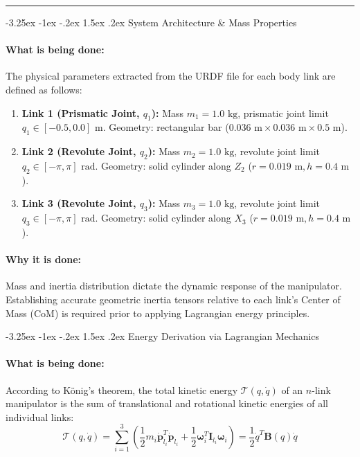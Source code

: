 \documentclass[11pt, a4paper]{article}
\makeatletter
\renewcommand{\subsection}{\@startsection{subsection}{2}{\z@}%
    {-3.25ex \@plus -1ex \@minus -.2ex}%
    {1.5ex \@plus .2ex}%
    {\normalfont\large\bfseries\color{brandaccent}}}
\makeatother
\begin{document}
\hrule
\vspace{1.5em}

\subsection{System Architecture \& Mass Properties}
\paragraph{What is being done:}
The physical parameters extracted from the URDF file for each body link are defined as follows:
\begin{enumerate}[leftmargin=1.5em]
    \item \textbf{Link 1 (Prismatic Joint, $q_1$):} Mass $m_1 = 1.0\text{ kg}$, prismatic joint limit $q_1 \in [-0.5, 0.0]\text{ m}$. Geometry: rectangular bar ($0.036\text{ m} \times 0.036\text{ m} \times 0.5\text{ m}$).
    \item \textbf{Link 2 (Revolute Joint, $q_2$):} Mass $m_2 = 1.0\text{ kg}$, revolute joint limit $q_2 \in [-\pi, \pi]\text{ rad}$. Geometry: solid cylinder along $Z_2$ ($r = 0.019\text{ m}, h = 0.4\text{ m}$).
    \item \textbf{Link 3 (Revolute Joint, $q_3$):} Mass $m_3 = 1.0\text{ kg}$, revolute joint limit $q_3 \in [-\pi, \pi]\text{ rad}$. Geometry: solid cylinder along $X_3$ ($r = 0.019\text{ m}, h = 0.4\text{ m}$).
\end{enumerate}

\paragraph{Why it is done:}
Mass and inertia distribution dictate the dynamic response of the manipulator. Establishing accurate geometric inertia tensors relative to each link's Center of Mass (CoM) is required prior to applying Lagrangian energy principles.

\subsection{Energy Derivation via Lagrangian Mechanics}
\paragraph{What is being done:}
According to König's theorem, the total kinetic energy $\mathcal{T}(q, \dot{q})$ of an $n$-link manipulator is the sum of translational and rotational kinetic energies of all individual links:
\begin{equation}
    \mathcal{T}(q, \dot{q}) = \sum_{i=1}^{3} \left( \frac{1}{2} m_i \dot{\mathbf{p}}_{l_i}^T \dot{\mathbf{p}}_{l_i} + \frac{1}{2} \boldsymbol{\omega}_i^T \mathbf{I}_{l_i} \boldsymbol{\omega}_i \right) = \frac{1}{2} \dot{q}^T \mathbf{B}(q) \dot{q}
\end{equation}
\end{document}

